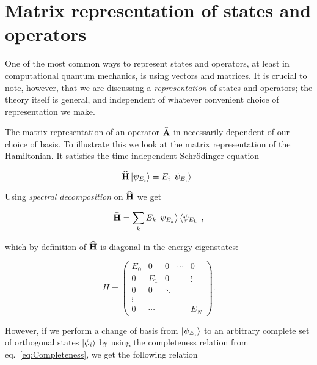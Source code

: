 \chapter{Matrix representation of states and operators}

One of the most common ways to represent states and operators, at least in computational quantum mechanics, is using vectors and matrices. It is crucial to note, however, that we are discussing a \textit{representation} of states and operators; the theory itself is general, and independent of whatever convenient choice of representation we make. 

The matrix representation of an operator ${\bf\widehat{A}}$ in necessarily dependent of our choice of basis. To illustrate this we look at the matrix representation of the Hamiltonian. It satisfies the time independent Schrödinger equation

\[
 {\bf\widehat{H}}\left| \psi_{E_i} \right> = E_i\left| \psi_{E_i} \right>.
\]

Using \textit{spectral decomposition} on ${\bf\widehat{H}}$ we get

\begin{equation}
 {\bf\widehat{H}} = \sum_{k} E_k\left| \psi_{E_k} \right>\left< \psi_{E_k} \right|, \label{eq:spectralHamiltonian}
\end{equation}

which by definition of ${\bf\widehat{H}}$ is diagonal in the energy eigenstates:

\begin{equation}
H = \left( 
\begin{array}{ccccc}
E_0    & 0      & 0      & \cdots & 0      \\
0      & E_1    & 0      &        & \vdots \\
0      & 0      & \ddots &        &        \\
\vdots &        &        &        &        \\
0      & \cdots &        &        & E_N
\end{array} \right).
\end{equation}

However, if we perform a change of basis from $\left| \psi_{E_i} \right>$ to an arbitrary complete set of orthogonal states $\left| \phi_i \right>$ by using the completeness relation from eq.~\ref{eq:Completeness}, we get the following relation

